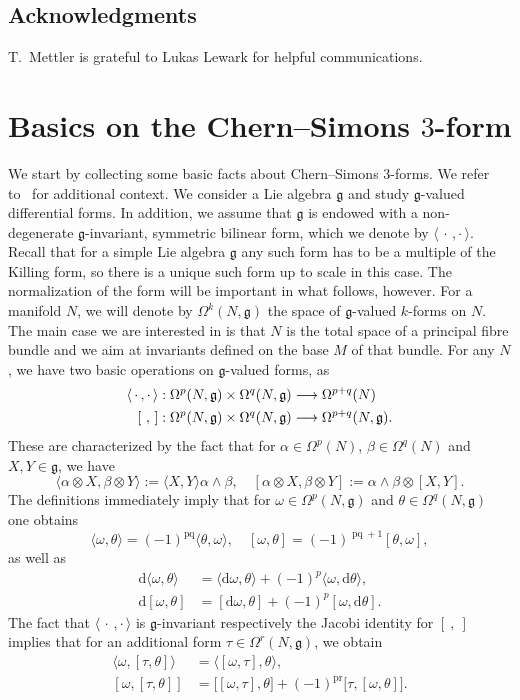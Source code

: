 \documentclass[AHL,Unicode,longabstracts]{cedram}
\newcommand{\x}{\times}
\newcommand{\al}{\alpha}
\newcommand{\be}{\beta}
\newcommand{\om}{\omega}
\renewcommand{\th}{\theta}
\newcommand{\Om}{\Omega}
\newcommand{\B}[2]{\langle#1,#2\rangle}
\DeclareMathOperator{\pq}{pq}
\DeclareMathOperator{\pr}{pr}
\renewcommand*{\d}{\mathrm{d}}
\newcommand{\fkg}{\mathfrak{g}}
\renewcommand*{\to}{\mathchoice{\longrightarrow}{\rightarrow}{\rightarrow}{\rightarrow}}
\begin{document}
\subsection*{Acknowledgments}

T.~Mettler is grateful to Lukas Lewark for helpful communications.

\section{Basics on the Chern--Simons \texorpdfstring{$3$}{3}-form}\label{1}

We start by collecting some basic facts about Chern--Simons $3$-forms. We refer to~\cite{MR1337109} for additional context. We consider a Lie algebra $\fkg$ and study $\fkg$-valued differential forms. In addition, we assume that $\fkg$ is endowed with a non-degenerate $\fkg$-invariant, symmetric bilinear form, which we denote by $\B{\,\cdot\,}{\cdot\,}$. Recall that for a simple Lie algebra $\fkg$ any such form has to be a multiple of the Killing form, so there is a unique such form up to scale in this case. The normalization of the form will be important in what follows, however. For a manifold $N$, we will denote by $\Om^k(N,\fkg)$ the space of $\fkg$-valued $k$-forms on $N$. The main case we are interested in is that $N$ is the total space of a principal fibre bundle and we aim at invariants defined on the base $M$ of that bundle. For any $N$, we have two basic operations on $\fkg$-valued forms, as
\begin{align*}
\B{\,\cdot\,}{\cdot\,}:\Om^p(N,\fkg)\x\Om^q(N,\fkg)&\to \Om^{p+q}(N) \\
[\,\,,\,]:\Om^p(N,\fkg)\x\Om^q(N,\fkg)&\to \Om^{p+q}(N,\fkg).
\end{align*}
These are characterized by the fact that for $\al\in\Om^p(N)$, $\be\in\Om^q(N)$ and $X,Y\in\fkg$, we have
\begin{equation}\label{eq:basic-ops}
\B{\al\otimes X}{\be\otimes Y}:=\B{X}{Y} \al\wedge\be, \quad [\al\otimes X,\be\otimes Y]:=\al\wedge\be\otimes[X,Y].
\end{equation}
The definitions immediately imply that for $\om\in\Om^p(N,\fkg)$ and $\theta\in\Om^q(N,\fkg)$ one obtains
\[
\B{\om}{\theta}=(-1)^{\pq}\B{\theta}{\omega}, \quad [\om,\theta]=(-1)^{\pq+1}[\theta,\om],
\]
as well as
\begin{align}
\d\B{\om}{\theta}&=\B{\d\om}{\th}+(-1)^p\B{\om}{\d\th},\label{eq:dB} \\
\d[\om,\th]&=[\d\om,\th]+(-1)^p[\om,\d\th].\label{eq:dL}
\end{align}
The fact that $\B{\,\cdot\,}{\cdot\,}$ is $\fkg$-invariant respectively the Jacobi identity for $[\ ,\ ]$ implies that for an additional form $\tau\in\Om^r(N,\fkg)$, we obtain
\begin{align}
\B{\om}{[\tau,\th]}&=\B{[\om}{\tau],\theta},\label{eq:B-invar}\\
[\om,[\tau,\theta]]&=\bigl[[\om,\tau],\theta]+(-1)^{\pr}[\tau,[\om,\theta]\bigr].\label{eq:Jacobi}
\end{align}
\end{document}
